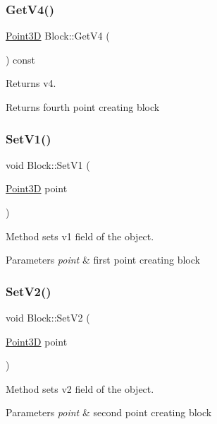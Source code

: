 \subsubsection{\texorpdfstring{Get\+V4()}{GetV4()}}
{\footnotesize\ttfamily \hyperlink{class_point3_d}{Point3D} Block\+::\+Get\+V4 (\begin{DoxyParamCaption}{ }\end{DoxyParamCaption}) const}

Returns v4. \begin{DoxyReturn}{Returns}
fourth point creating block 
\end{DoxyReturn}
\hypertarget{class_block_ab70b247a67e1adb3370943c8393d6077}{}\label{class_block_ab70b247a67e1adb3370943c8393d6077} 
\subsubsection{\texorpdfstring{Set\+V1()}{SetV1()}}
{\footnotesize\ttfamily void Block\+::\+Set\+V1 (\begin{DoxyParamCaption}\item[{\hyperlink{class_point3_d}{Point3D}}]{point }\end{DoxyParamCaption})}

Method sets v1 field of the object. 
\begin{DoxyParams}{Parameters}
{\em point} & first point creating block \\
\hline
\end{DoxyParams}
\hypertarget{class_block_a1ad1834202712fe4c67e1af5f7ccd7fd}{}\label{class_block_a1ad1834202712fe4c67e1af5f7ccd7fd} 
\subsubsection{\texorpdfstring{Set\+V2()}{SetV2()}}
{\footnotesize\ttfamily void Block\+::\+Set\+V2 (\begin{DoxyParamCaption}\item[{\hyperlink{class_point3_d}{Point3D}}]{point }\end{DoxyParamCaption})}

Method sets v2 field of the object. 
\begin{DoxyParams}{Parameters}
{\em point} & second point creating block \\
\hline
\end{DoxyParams}
\hypertarget{class_block_a01d25d342ed145e454bf976b7be7e562}{}\label{class_block_a01d25d342ed145e454bf976b7be7e562} 
